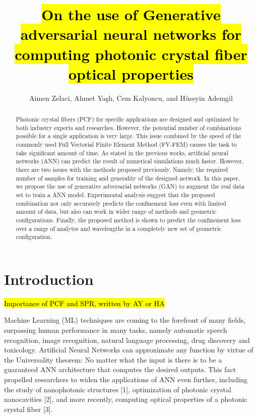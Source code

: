 \documentclass[draft, a4, 10pt, onecolumn]{IEEEtran}
\begin{document}
\title{\hl{On the use of Generative adversarial neural networks for computing photonic crystal fiber optical properties}}

\author{Aimen Zelaci, Ahmet Yaşlı, Cem Kalyoncu, and Hüseyin Ademgil}

\maketitle
	
\begin{abstract}
Photonic crystal fibers (PCF) for specific applications are designed and optimized by both industry experts and researches. However, the potential number of combinations possible for a single application is very large. This issue combined by the speed of the commonly used Full Vectorial Finite Element Method (FV-FEM) causes the task to take significant amount of time. As stated in the previous works, artificial neural networks (ANN) can predict the result of numerical simulations much faster. However, there are two issues with the methods proposed previously. Namely, the required number of samples for training and generality of the designed network. In this paper, we  propose the use of generative adversarial networks (GAN) to augment the real data set to train a ANN model. Experimental analysis suggest that the proposed combination not only accurately predicts the confinement loss even with limited amount of data, but also can work in wider range of methods and geometric configurations. Finally, the proposed method is shown to predict the confinement loss over a range of analytes and wavelengths in a completely new set of geometric configuration.
\end{abstract}

\section{Introduction}

\hl{Importance of PCF and SPR, written by AY or HA}
	
Machine Learning (ML) techniques are coming to the forefront of many fields, surpassing human performance in many tasks, namely automatic speech recognition, image recognition, natural language processing, drug discovery and toxicology. Artificial Neural Networks can approximate any function by virtue of the Universality theorem: No matter what the input is there is to be a guaranteed ANN architecture that computes the desired outputs. This fact propelled researchers to widen the applications of ANN even further, including the study of nanophotonic structures [1], optimization of photonic crystal nanocavities [2], and more recently, computing optical properties of a photonic crystal fiber [3].
\end{document}

